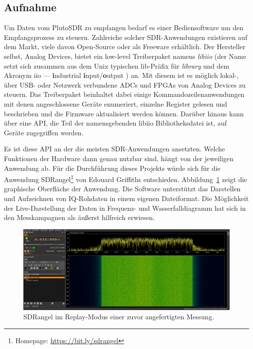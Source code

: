 \subsection{Aufnahme}

Um Daten vom PlutoSDR zu empfangen bedarf es einer Bediensoftware um den Empfangsprozess zu steuern. Zahlreiche solcher SDR-Anwendungen existieren auf dem Markt, viele davon Open-Source oder als Freeware erhältlich. Der Hersteller selbst, Analog Devices, bietet ein low-level Treiberpaket namens \emph{libiio} (der Name setzt sich zusammen aus dem Unix typischen lib-Präfix für \emph{library} und dem Akronym iio --- %
\textbf{i}ndustrial \textbf{i}nput/\textbf{o}utput%
) an. Mit diesem ist es möglich lokal-, über USB- oder Netzwerk verbundene ADCs und FPGAs von Analog Devices zu steuern. Das Treiberpaket beinhaltet dabei einige Kommandozeilenanwendungen mit denen angeschlossene Geräte enumeriert, einzelne Register gelesen und beschrieben und die Firmware ak­tu­a­li­sie­rt werden können. Darüber hinaus kann über eine API, die Teil der namensgebenden libiio Bibliotheksdatei ist, auf Geräte zugegriffen werden.

Es ist diese API an der die meisten SDR-Anwendungen ansetzten. Welche Funktionen der Hardware dann genau nutzbar sind, hängt von der jeweiligen Anwendung ab. Für die Durchführung dieses Projekts würde sich für die Anwendung SDRangel\footnote{Homepage: \url{https://bit.ly/sdrangel}} von Edouard Griffiths entschieden. Abbildung~\ref{fig:sdrangel_screenshot} zeigt die graphische Oberfläche der Anwendung. Die Software unterstützt das Darstellen und Aufzeichnen von IQ-Rohdaten in einem eigenen Dateiformat. Die Möglichkeit der Live-Darstellung der Daten in Frequenz- und Wasserfalldiagramm hat sich in den Messkampagnen als äußerst hilfreich erwiesen.

\begin{figure}[htb]
    \centering
    \includegraphics[width=\textwidth]{images/sdrangel.png}
    \caption{SDRangel im Replay-Modus einer zuvor angefertigten Messung.}\label{fig:sdrangel_screenshot}
\end{figure}

